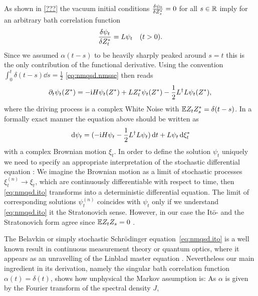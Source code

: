 As shown in \autoref{???} the vacuum initial conditions $\frac{\delta \psi_0}{\delta {Z}^*_s} = 0$ for all $s \in \mathbb{R}$ imply for an arbitrary bath correlation function
\begin{equation}
  \frac{\delta \psi_t}{\delta {Z}^*_t} = L \psi_t \quad (t > 0).
  \label{eq:nmqsd.dpsit_dzt}
\end{equation}
Since we assumed $\alpha(t-s)$ to be heavily sharply peaked around $s = t$ this is the only contribution of the functional derivative.
Using the convention $\int_0^t \delta(t-s) \dd s = \frac{1}{2}$ \autoref{eq:nmqsd.nmsse} then reads
\begin{equation*}
  \partial_t \psi_t({Z}^*) = -\mathrm{i} H \psi_t({Z}^*) + L{Z}^*_t\psi_t({Z}^*) - \frac{1}{2}L^\dagger L\psi_t({Z}^*),
\end{equation*}
where the driving process is a complex White Noise with $\E{Z_t \ZZ_s} = \delta(t-s)$.
In a formally exact manner the equation above should be written as
\begin{equation}
  \, \mathrm{d}\psi_t = (-\mathrm{i}H\psi_t - \frac{1}{2} L^\dagger L \psi_t) \, \mathrm{d} t + L\psi_t \, \mathrm{d} {\xi}^*_t
  \label{eq:nmqsd.ito}
\end{equation}
with a complex Brownian motion $\xi_t$.
In order to define the solution $\psi_t$ uniquely we need to specify an appropriate interpretation of the stochastic differential equation \cite[p.~36]{Ok03_sde}:
We imagine the Brownian motion as a limit of stochastic processes $\xi^{(n)}_t \to \xi_t$, which are continuously differentiable with respect to time, then \autoref{eq:nmqsd.ito} transforms into a deterministic differential equation.
The limit of corresponding solutions $\psi^{(n)}_t$ coincides with $\psi_t$ only if we understand \autoref{eq:nmqsd.ito} it the Stratonovich sense.
However, in our case the It\=o- and the Stratonovich form agree since $\E Z_t Z_s = 0$ \cite[???]{GaCr85_handbook}.

The Belavkin or simply stochastic Schrödinger equation~\ref{eq:nmqsd.ito} is a well known result in continuous measurement theory or quantum optics, where it appears as an unravelling of the Linblad master equation \cite{BaGr09_trajectories,???}.
Nevertheless our main ingredient in its derivation, namely the singular bath correlation function $\alpha(t) = \delta(t)$, shows how unphysical the Markov assumption is:
As $\alpha$ is given by the Fourier transform of the spectral density $J$,

